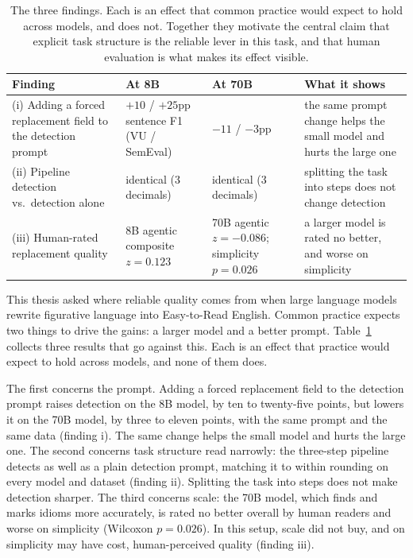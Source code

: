 \begin{table}[h!]
\centering
\small
\begin{tabular}{p{3.4cm}p{2.7cm}p{2.7cm}p{4.0cm}}
\hline
\textbf{Finding} & \textbf{At 8B} & \textbf{At 70B} & \textbf{What it shows} \\
\hline
(i) Adding a forced replacement field to the detection prompt & $+10$ / $+25$pp sentence F1 (VU / SemEval) & $-11$ / $-3$pp & the same prompt change helps the small model and hurts the large one \\
(ii) Pipeline detection vs.\ detection alone & identical (3 decimals) & identical (3 decimals) & splitting the task into steps does not change detection \\
(iii) Human-rated replacement quality & 8B agentic composite $z = 0.123$ & 70B agentic $z = -0.086$; simplicity $p = 0.026$ & a larger model is rated no better, and worse on simplicity \\
\hline
\end{tabular}
\caption{The three findings. Each is an effect that common practice would expect to hold across models, and does not. Together they motivate the central claim that explicit task structure is the reliable lever in this task, and that human evaluation is what makes its effect visible.}
\label{tab:model-dependence}
\end{table}

This thesis asked where reliable quality comes from when large language models rewrite figurative language into Easy-to-Read English. Common practice expects two things to drive the gains: a larger model and a better prompt. Table~\ref{tab:model-dependence} collects three results that go against this. Each is an effect that practice would expect to hold across models, and none of them does.

The first concerns the prompt. Adding a forced replacement field to the detection prompt raises detection on the 8B model, by ten to twenty-five points, but lowers it on the 70B model, by three to eleven points, with the same prompt and the same data (finding i). The same change helps the small model and hurts the large one. The second concerns task structure read narrowly: the three-step pipeline detects as well as a plain detection prompt, matching it to within rounding on every model and dataset (finding ii). Splitting the task into steps does not make detection sharper. The third concerns scale: the 70B model, which finds and marks idioms more accurately, is rated no better overall by human readers and worse on simplicity (Wilcoxon $p = 0.026$). In this setup, scale did not buy, and on simplicity may have cost, human-perceived quality (finding iii).

